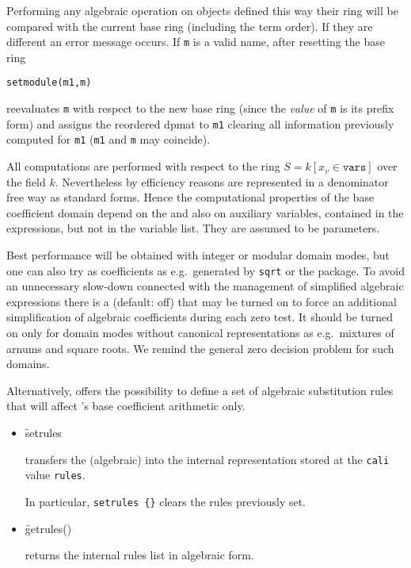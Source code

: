 Performing any algebraic operation on objects defined this way their
ring will be compared with the current base ring (including the term
order). If they are different an error message occurs. If \texttt{m} is
a valid name, after resetting the base ring
\begin{verbatim}
setmodule(m1,m)
\end{verbatim}
reevaluates \texttt{m} with respect to the new base ring (since the
\emph{value} of \texttt{m} is its prefix form) and assigns the reordered
dpmat to \texttt{m1} clearing all information previously computed for
\texttt{m1} (\texttt{m1} and \texttt{m} may coincide).

All computations are performed with respect to the ring $S=k[x_v\in
\texttt{vars}]$ over the field $k$. Nevertheless by efficiency reasons
 are represented in a denominator free way as
standard forms. Hence the computational properties of the base
coefficient domain depend on the  and also on auxiliary
variables, contained in the expressions, but not in the variable
list. They are assumed to be parameters.

Best performance will be obtained with integer or modular domain
modes, but one can also try  as coefficients
as e.g.\ generated by \texttt{sqrt} or the  package. To avoid
an unnecessary slow-down connected with the management of simplified
algebraic expressions there is a  (default:
off) that may be turned on to force an additional simplification of
algebraic coefficients during each zero test. It should be turned on
only for domain modes without canonical representations as e.g.\
mixtures of arnums and square roots. We remind the general zero
decision problem for such domains.

Alternatively,  offers the possibility to define a set of
algebraic substitution rules that will affect \package{CALI}'s base coefficient
arithmetic only.
\hypertarget{operator:SETRULES}{}
\begin{itemize}
\item[]
\begin{syntax}
   \f{setrules} 
\end{syntax}
\ttindextype[CALI]{setrules}{operator}
transfers the (algebraic) \meta{rule list} into the internal
representation stored at the \texttt{cali} value \texttt{rules}.

In particular, \texttt{setrules \{\}} clears the rules previously set.

\item[]
\hypertarget{operator:GETRULES}{}
\begin{syntax}
   \f{getrules}()
\end{syntax}
returns the internal  rules list in algebraic form.
\end{itemize}

